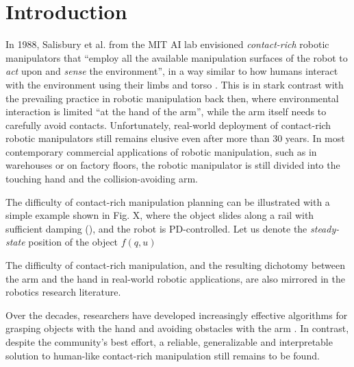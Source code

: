 \chapter{Introduction}
In 1988, Salisbury et al. from the MIT AI lab envisioned \emph{contact-rich} robotic manipulators that ``employ all the available manipulation surfaces of the robot to \emph{act} upon and \emph{sense} the environment'', in a way similar to how humans interact with the environment using their limbs and torso \cite{salisbury1988preliminary}. This is in stark contrast with the prevailing practice in robotic manipulation back then, where environmental interaction is limited ``at the hand of the arm'', while the arm itself needs to carefully avoid contacts. Unfortunately, real-world deployment of contact-rich robotic manipulators still remains elusive even after more than 30 years. In most contemporary commercial applications of robotic manipulation, such as in warehouses or on factory floors, the robotic manipulator is still divided into the touching hand and the collision-avoiding arm. 

The difficulty of contact-rich manipulation planning can be illustrated with a simple example shown in Fig. X, where the object slides along a rail with sufficient damping (), and the robot is PD-controlled. Let us denote the \emph{steady-state} position of the object 
$f(q, u)$

The difficulty of contact-rich manipulation, and the resulting dichotomy between the arm and the hand in real-world robotic applications, are also mirrored in the robotics research literature. 


Over the decades, researchers have developed increasingly effective algorithms for grasping objects with the hand \cite[]{siciliano2008springer} and avoiding obstacles with the arm \cite{lavalle1998rapidly, marcucci2022motion}. In contrast, despite the community's best effort, a reliable, generalizable and interpretable solution to human-like contact-rich manipulation still remains to be found. 

